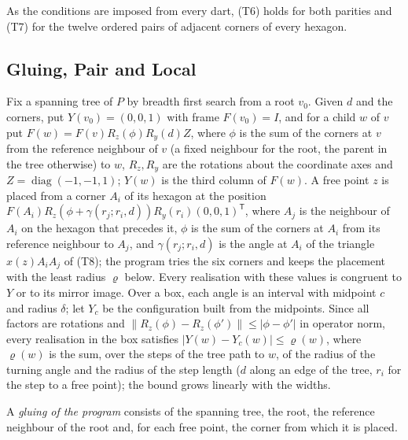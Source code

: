 \documentclass[12pt]{amsart}
\theoremstyle{definition}
\theoremstyle{plain}
\theoremstyle{definition}
\newcommand{\leanmap}[1]{\ignorespaces}
\newcommand{\mapnote}[1]{\ignorespaces}
\begin{document}
As the conditions are imposed from every dart, (T6) holds for both parities and (T7) for the twelve ordered pairs of adjacent corners of every hexagon.

\subsection{Gluing, Pair and Local}\label{sec:glue}\leanmap{Tammes15.frame_child_inner, Tammes15.frame_child_eq, Tammes15.frame_child_back, Tammes15.stepM_sub_apply_le, Tammes15.frame_path_enclosure, Tammes15.pair_core, Tammes15.norm_sub_eq_two_sin, Tammes15.local_core, Tammes15.glue_congruent, Tammes15.glue_congruent_proof}\mapnote{the gluing of the formal statement is that of Definition \ref{def:glue}, which differs from that of the program by a reflection (Lemma \ref{lem:verdicts})}
Fix a spanning tree of $P$ by breadth first search from a root $v_0$. Given $d$ and the corners, put $Y(v_0)=(0,0,1)$ with frame $F(v_0)=I$, and for a child $w$ of $v$ put $F(w)=F(v)R_z(\phi)R_y(d)Z$, where $\phi$ is the sum of the corners at $v$ from the reference neighbour of $v$ (a fixed neighbour for the root, the parent in the tree otherwise) to $w$, $R_z,R_y$ are the rotations about the coordinate axes and $Z=\operatorname{diag}(-1,-1,1)$; $Y(w)$ is the third column of $F(w)$. A free point $z$ is placed from a corner $A_i$ of its hexagon at the position $F(A_i)R_z(\phi+\gamma(r_{j};r_i,d))R_y(r_i)(0,0,1)^{\mathsf T}$, where $A_j$ is the neighbour of $A_i$ on the hexagon that precedes it, $\phi$ is the sum of the corners at $A_i$ from its reference neighbour to $A_j$, and $\gamma(r_j;r_i,d)$ is the angle at $A_i$ of the triangle $x(z)A_iA_j$ of (T8); the program tries the six corners and keeps the placement with the least radius $\varrho$ below. Every realisation with these values is congruent to $Y$ or to its mirror image. Over a box, each angle is an interval with midpoint $c$ and radius $\delta$; let $Y_c$ be the configuration built from the midpoints. Since all factors are rotations and $\|R_z(\phi)-R_z(\phi')\|\le|\phi-\phi'|$ in operator norm, every realisation in the box satisfies $|Y(w)-Y_c(w)|\le\varrho(w)$, where $\varrho(w)$ is the sum, over the steps of the tree path to $w$, of the radius of the turning angle and the radius of the step length ($d$ along an edge of the tree, $r_i$ for the step to a free point); the bound grows linearly with the widths.

A \emph{gluing of the program} consists of the spanning tree, the root, the reference neighbour of the root and, for each free point, the corner from which it is placed.
\end{document}
